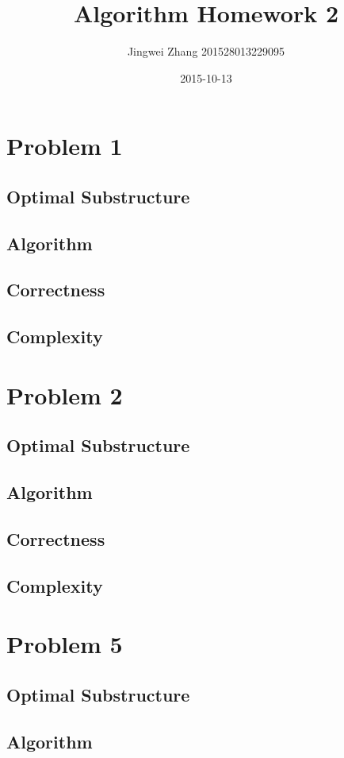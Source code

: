 \documentclass[]{article}
\title{Algorithm Homework 2}
\date{2015-10-13}
\author{Jingwei Zhang 201528013229095}
\begin{document}
    \maketitle
    \section{Problem 1}
        \subsection{Optimal Substructure}
        \subsection{Algorithm}
        \subsection{Correctness}
        \subsection{Complexity}
        
    \section{Problem 2}
        \subsection{Optimal Substructure}
        \subsection{Algorithm}
        \subsection{Correctness}
        \subsection{Complexity}
    
    \section{Problem 5}
        \subsection{Optimal Substructure}
        \subsection{Algorithm}
\end{document}
